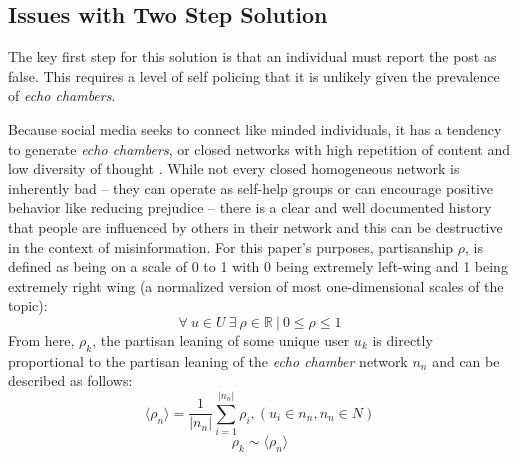 \documentclass[NETN,manuscript]{stjour-new}
\begin{document}
 \subsection{Issues with Two Step Solution}
 The key first step for this solution is that an individual must report the post as false. This requires a level of self policing that it is unlikely given the prevalence of \textit{echo chambers}. 

Because social media seeks to connect like minded individuals, it has a tendency to generate \textit{echo chambers}, or closed networks with high repetition of content and low diversity of thought \citep{adibi2005proceedings, bastian2009international, pariser2011filter,bozdag2015breaking}. While not every closed homogeneous network is inherently bad -- they can operate as self-help groups \citep{kast2012under} or can encourage positive behavior like reducing prejudice \citep{paluck2011peer} -- there is a clear and well documented history that people are influenced by others in their network \citep{cialdini2004social,bollinger2012peer, bond201261,gerber2008social,gerber2009descriptive,meer2011brother,paluck2012salience,del2016spreading,bessi2015viral} and this can be destructive in the context of misinformation. For this paper's purposes, partisanship $\rho$, is defined as being on a scale of 0 to 1 with 0 being extremely left-wing and 1 being extremely right wing (a normalized version of most one-dimensional scales of the topic):
\begin{equation}
\label{basepartisanship}
    \forall \ u \in U \ \exists \ \rho \in \mathbb{R} \ | \ 0 \leq \rho \leq 1
\end{equation}
From here, $\rho_k$, the partisan leaning of some unique user $u_k$ is directly proportional to the partisan leaning of the \textit{echo chamber} network $n_n$ and can be described as follows:
 \begin{equation}
    \label{ech chamber}
        \langle \rho_n \rangle = \frac{1}{|n_n|}\sum_{i=1}^{|n_n|}{\rho_i}, (u_i \in n_n, n_n \in N)
 \end{equation}
 \begin{equation}
    \label{leaningproportionaltonetwork}
        \rho_k \sim \langle \rho_n \rangle
 \end{equation}
 
\end{document}
